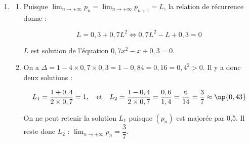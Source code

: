 \begin{enumerate}
\begin{enumerate}
$0,3 \leqslant 0,3 + 0,7 \times p_n^2 \leqslant 0,3 + 0,7 \times p_{n+1}^2 \leqslant 0,3 + 0,7 \times 0,5^2$, soit 

$0,3 \leqslant p_{n+1} \leqslant p_{n+2} \leqslant 0,475$. On peut donc écrire :

$0 \leqslant p_{n+1} \leqslant p_{n+2} \leqslant 0,5$ : la relation est vraie au rang $n + 1$.

\emph{Conclusion} : la relation est vraie au rang 0 et si elle vraie au rang $n \in \N$, elle est encore vraie au rang $n + 1$ : d'après la principe de récurrence, pour tout entier naturel $n$, on a  $0 \leqslant p_n \leqslant p_{n+1} \leqslant0,5$
		\item %
Le résultat précédent montre que la suite $\left(p_n\right)$ est croissante et majorée par 0,5 : elle est donc convergente vers une limite $L$ telle que $L \leqslant 0,5$.
	\end{enumerate}
\item %
	\begin{enumerate}
		\item %
		
Puisque $\displaystyle\lim_{n \to + \infty} p_n = \displaystyle\lim_{n \to + \infty} p_{n+1} = L$, la relation de récurrence donne :

\[L = 0,3 + 0,7L^2 \iff 0,7L^2 - L + 0,3 = 0\]

$L$ est solution de l'équation $0,7x^2 - x  + 0,3 = 0$.
		\item %
		On a $\Delta = 1 - 4 \times 0,7 \times 0,3 = 1 - 0,84 = 0,16 = 0,4^2 > 0$. Il y a donc deux solutions :
		
\[L_1 = \dfrac{1 + 0,4}{2\times 0,7} = 1, \quad \text{et}\quad L_2 = \dfrac{1 - 0,4}{2\times 0,7} = \frac{0,6}{1,4} = \dfrac{6}{14} = \dfrac37 \approx \np{0,43}\]
		
On ne peut retenir la solution $L_1$ puisque $\left(p_n\right)$ est majorée par 0,5. Il reste donc $L_2$ : 
$\displaystyle\lim_{n \to + \infty} p_n = \dfrac37$.
	\end{enumerate}
\end{enumerate}

